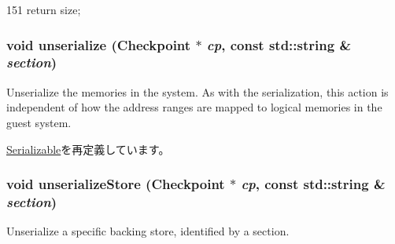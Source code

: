 \begin{DoxyCode}
151 { return size; }
\end{DoxyCode}
\hypertarget{classPhysicalMemory_af22e5d6d660b97db37003ac61ac4ee49}{
\subsubsection[{unserialize}]{\setlength{\rightskip}{0pt plus 5cm}void unserialize ({\bf Checkpoint} $\ast$ {\em cp}, \/  const std::string \& {\em section})}}
\label{classPhysicalMemory_af22e5d6d660b97db37003ac61ac4ee49}
Unserialize the memories in the system. As with the serialization, this action is independent of how the address ranges are mapped to logical memories in the guest system. 

\hyperlink{classSerializable_af100c4e9feabf3cd918619c88c718387}{Serializable}を再定義しています。\hypertarget{classPhysicalMemory_ad180e1b910a31a4f7e6ad1a701c8a286}{
\subsubsection[{unserializeStore}]{\setlength{\rightskip}{0pt plus 5cm}void unserializeStore ({\bf Checkpoint} $\ast$ {\em cp}, \/  const std::string \& {\em section})}}
\label{classPhysicalMemory_ad180e1b910a31a4f7e6ad1a701c8a286}
Unserialize a specific backing store, identified by a section. 

